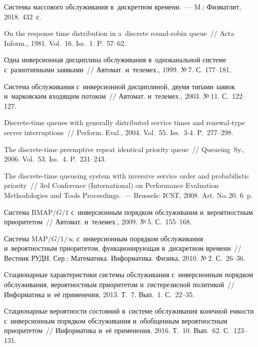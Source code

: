 \begin{multicols}{2}
{{\begin{thebibliography}{99}
Системы массового обслуживания в~дискретном времени.~--- M.: Физматлит, 2018. 432~с.

 On the response time distribution in a~discrete round-robin queue~//
Acta Inform., 1981. Vol.~16. Iss.~1. P.~57--62.

Одна инверсионная дисциплина обслуживания в~одноканальной системе с~разнотипными
 заявками~// Автомат. и~телемех., 1999. №\,7. С. 177--181.

 Система обслуживания с~инверсионной дисциплиной, 
двумя типами заявок и~марковским входящим потоком~//  Автомат. и~телемех., 2003. №\,11. С.~122--127.


Discrete-time queues with generally distributed service times and renewal-type 
server interruptions~// Perform. Eval., 2004. Vol.~55. Iss.~\mbox{3-4}. P.~277--298.


The discrete-time preemptive repeat identical priority queue~// Queueing~Sy., 2006. 
Vol.~53. Iss.~4. P.~231--243.

The discrete-time queueing system with inversive service order and probabilistic
 priority~//
3rd Conference (International) on Performance Evaluation Methodologies and Tools 
 Proceedings.~--- Brussels: ICST, 2008. Art. No.\,20. 6~p.


 Система ${\mathrm{BMAP}/G/1}$ 
с~инверсионным порядком обслуживания и~вероятностным приоритетом~// 
Автомат. и~телемех., 2009. №\,5. С.~155--168.


Система $\mathrm{MAP}/G/1/\infty$ с~инверсионным порядком
обслуживания и~вероятностным приоритетом,
функционирующая в~дискретном времени~//
Вестник РУДН. Сер.: Математика. Информатика. Физика, 2010.
№\,2. С.~26--36.

Стационарные характеристики системы обслуживания 
с~инверсионным порядком обслуживания, вероятностным
приоритетом и~гистерезисной политикой~//
Информатика и~её применения, 2013. Т.~7. Вып.~1. С.~22--35.

Стационарные вероятности состояний в~системе обслуживания конечной 
емкости с~инверсионным порядком обслуживания и~обобщенным вероятностным приоритетом~// 
Информатика и~её применения, 2016. Т.~10. Вып.~62. С.~123--131.


\end{thebibliography}}}
\end{multicols}
